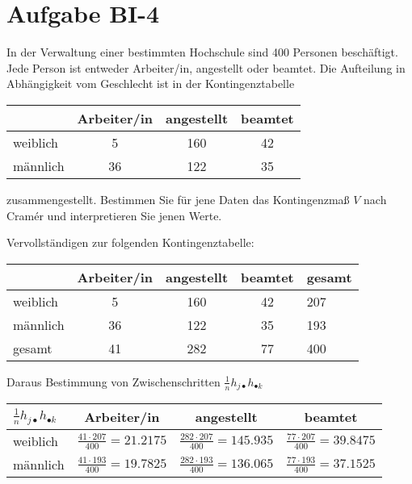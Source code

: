 
\section{Aufgabe BI-4}

\begin{task}
    In der Verwaltung einer bestimmten Hochschule sind 400 Personen beschäftigt. Jede Person ist entweder Arbeiter/in, angestellt oder beamtet. Die Aufteilung in Abhängigkeit vom Geschlecht ist in der Kontingenztabelle

    \begin{table}[H]
    \centering
    \begin{tabular}{l|c|c|c}
                 & Arbeiter/in & angestellt & beamtet \\ \hline
        weiblich & 5           & 160        & 42      \\
        männlich & 36          & 122        & 35     
    \end{tabular}
    \end{table}

    zusammengestellt. Bestimmen Sie für jene Daten das Kontingenzmaß $V$ nach Cramér und interpretieren Sie jenen Werte.
\end{task}

Vervollständigen zur folgenden Kontingenztabelle:
\nopagebreak
\begin{table}[H]
\centering
\begin{tabular}{l|ccc|l}
             & Arbeiter/in & angestellt & beamtet & gesamt \\ \hline
    weiblich & 5           & 160        & 42      & 207    \\
    männlich & 36          & 122        & 35      & 193    \\ \hline
    gesamt   & 41          & 282        & 77      & 400
\end{tabular}
\end{table}

Daraus Bestimmung von Zwischenschritten $\frac1n h_{j\bullet} h_{\bullet k}$
\nopagebreak
\begin{table}[H]
\centering
\begin{tabular}{l|c|c|c}
    $\frac1n h_{j\bullet} h_{\bullet k}$ & Arbeiter/in                        & angestellt                          & beamtet                            \\ \hline
    weiblich                             & $\frac{41\cdot207}{400} = 21.2175$ & $\frac{282\cdot207}{400} = 145.935$ & $\frac{77\cdot207}{400} = 39.8475$ \\
    männlich                             & $\frac{41\cdot193}{400} = 19.7825$ & $\frac{282\cdot193}{400} = 136.065$ & $\frac{77\cdot193}{400} = 37.1525$
\end{tabular}
\end{table}

